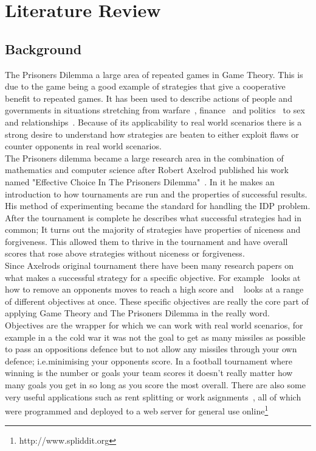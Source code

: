 
\chapter{Literature Review}\label{ch:literature}
\section{Background}\label{sec:background}
The Prisoners Dilemma a large area of repeated games in Game Theory.
This is due to the game being a good example of strategies that give a cooperative benefit to repeated games.
It has been used to describe actions of people and governments in situations stretching from warfare~\cite{tooby1988war,aumann1992handbook}, finance~\cite{cable1997finance} and politics~\cite{snidal1985Politics} to sex and relationships~\cite{low2015sex}.
Because of its applicability to real world scenarios there is a strong desire to understand how strategies are beaten to either exploit flaws or counter opponents in real world scenarios.\\

The Prisoners dilemma became a large research area in the combination of mathematics and computer science after Robert Axelrod published his work named "Effective Choice In The Prisoners Dilemma"~\cite{axelrod1980effective}.
In it he makes an introduction to how tournaments are run and the properties of successful results.
His method of experimenting became the standard for handling the IDP problem.
After the tournament is complete he describes what successful strategies had in common; 
It turns out the majority of strategies have properties of niceness and forgiveness.
This allowed them to thrive in the tournament and have overall scores that rose above strategies without niceness or forgiveness.\\

Since Axelrods original tournament there have been many research papers on what makes a successful strategy for a specific objective.
For example~\cite{press2012iterated} looks at how to remove an opponents moves to reach a high score and ~\cite{mittal2009optimal} looks at a range of different objectives at once.
These specific objectives are really the core part of applying Game Theory and The Prisoners Dilemma in the really word.
Objectives are the wrapper for which we can work with real world scenarios, for example in a the cold war it was not the goal to get as many missiles as possible to pass an oppositions defence but to not allow any missiles through your own defence; i.e.minimising your opponents score.
In a football tournament where winning is the number or goals your team scores it doesn't really matter how many goals you get in so long as you score the most overall.
There are also some very useful applications such as rent splitting or work asignments~\cite{goldman2015spliddit}, all of which were programmed and deployed to a web server for general use online\footnote{http://www.spliddit.org}


